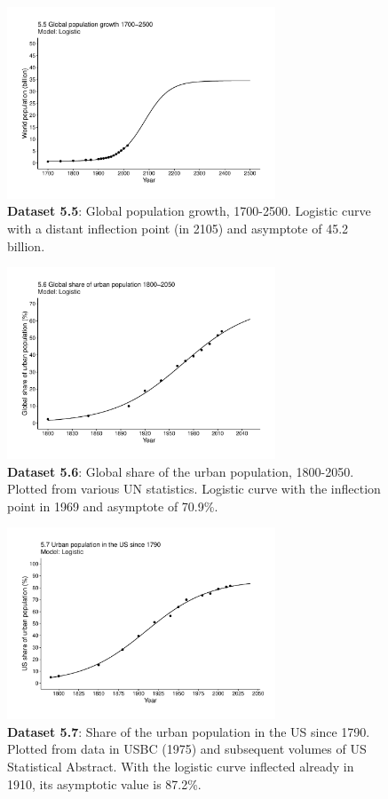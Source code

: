 \documentclass[aps,rmp,preprint,superscriptaddress,10pt,onecolumn]{article}
\begin{document}
\begin{figure}[h]
\includegraphics[width=8cm]{output/figs-ggplot/5.5.pdf}
\caption{\textbf{Dataset 5.5}: Global population growth, 1700-2500. Logistic curve with a distant inflection point (in 2105) and asymptote of 45.2 billion. }
\end{figure}
	
\begin{figure}[h]
\includegraphics[width=8cm]{output/figs-ggplot/5.6.pdf}
\caption{\textbf{Dataset 5.6}: Global share of the urban population, 1800-2050. Plotted from various UN statistics. Logistic curve with the inflection point in 1969 and asymptote of 70.9\%.}
\end{figure}
	
\begin{figure}[h]
\includegraphics[width=8cm]{output/figs-ggplot/5.7.pdf}
\caption{\textbf{Dataset 5.7}: Share of the urban population in the US since 1790. Plotted from data in USBC (1975) and subsequent volumes of US Statistical Abstract. With the logistic curve inflected already in 1910, its asymptotic value is 87.2\%.}
\end{figure}
	
\end{document}
